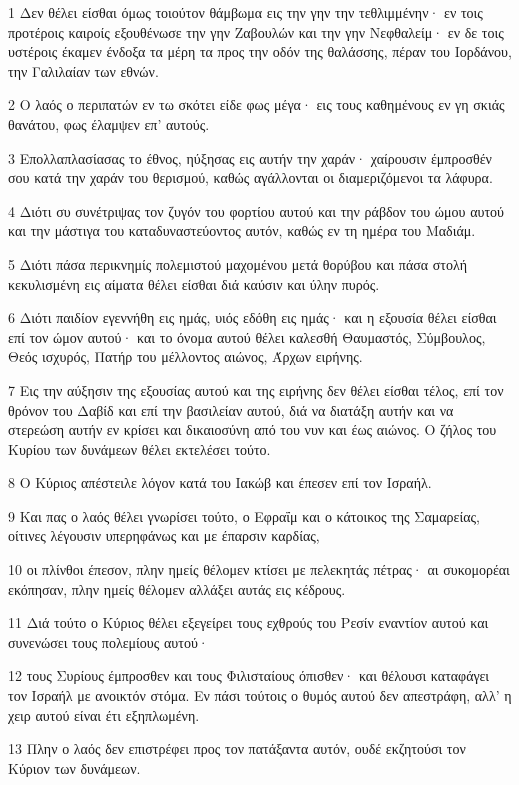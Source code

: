 \par 1 Δεν θέλει είσθαι όμως τοιούτον θάμβωμα εις την γην την τεθλιμμένην· εν τοις προτέροις καιροίς εξουθένωσε την γην Ζαβουλών και την γην Νεφθαλείμ· εν δε τοις υστέροις έκαμεν ένδοξα τα μέρη τα προς την οδόν της θαλάσσης, πέραν του Ιορδάνου, την Γαλιλαίαν των εθνών.
\par 2 Ο λαός ο περιπατών εν τω σκότει είδε φως μέγα· εις τους καθημένους εν γη σκιάς θανάτου, φως έλαμψεν επ' αυτούς.
\par 3 Επολλαπλασίασας το έθνος, ηύξησας εις αυτήν την χαράν· χαίρουσιν έμπροσθέν σου κατά την χαράν του θερισμού, καθώς αγάλλονται οι διαμεριζόμενοι τα λάφυρα.
\par 4 Διότι συ συνέτριψας τον ζυγόν του φορτίου αυτού και την ράβδον του ώμου αυτού και την μάστιγα του καταδυναστεύοντος αυτόν, καθώς εν τη ημέρα του Μαδιάμ.
\par 5 Διότι πάσα περικνημίς πολεμιστού μαχομένου μετά θορύβου και πάσα στολή κεκυλισμένη εις αίματα θέλει είσθαι διά καύσιν και ύλην πυρός.
\par 6 Διότι παιδίον εγεννήθη εις ημάς, υιός εδόθη εις ημάς· και η εξουσία θέλει είσθαι επί τον ώμον αυτού· και το όνομα αυτού θέλει καλεσθή Θαυμαστός, Σύμβουλος, Θεός ισχυρός, Πατήρ του μέλλοντος αιώνος, Άρχων ειρήνης.
\par 7 Εις την αύξησιν της εξουσίας αυτού και της ειρήνης δεν θέλει είσθαι τέλος, επί τον θρόνον του Δαβίδ και επί την βασιλείαν αυτού, διά να διατάξη αυτήν και να στερεώση αυτήν εν κρίσει και δικαιοσύνη από του νυν και έως αιώνος. Ο ζήλος του Κυρίου των δυνάμεων θέλει εκτελέσει τούτο.
\par 8 Ο Κύριος απέστειλε λόγον κατά του Ιακώβ και έπεσεν επί τον Ισραήλ.
\par 9 Και πας ο λαός θέλει γνωρίσει τούτο, ο Εφραΐμ και ο κάτοικος της Σαμαρείας, οίτινες λέγουσιν υπερηφάνως και με έπαρσιν καρδίας,
\par 10 οι πλίνθοι έπεσον, πλην ημείς θέλομεν κτίσει με πελεκητάς πέτρας· αι συκομορέαι εκόπησαν, πλην ημείς θέλομεν αλλάξει αυτάς εις κέδρους.
\par 11 Διά τούτο ο Κύριος θέλει εξεγείρει τους εχθρούς του Ρεσίν εναντίον αυτού και συνενώσει τους πολεμίους αυτού·
\par 12 τους Συρίους έμπροσθεν και τους Φιλισταίους όπισθεν· και θέλουσι καταφάγει τον Ισραήλ με ανοικτόν στόμα. Εν πάσι τούτοις ο θυμός αυτού δεν απεστράφη, αλλ' η χειρ αυτού είναι έτι εξηπλωμένη.
\par 13 Πλην ο λαός δεν επιστρέφει προς τον πατάξαντα αυτόν, ουδέ εκζητούσι τον Κύριον των δυνάμεων.
